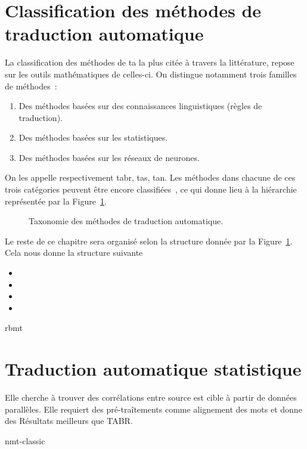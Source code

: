 \section{Classification des méthodes de traduction automatique}

La classification des méthodes de \acrshort{ta} la plus citée à travers la littérature, 
repose sur les outils mathématiques de celles-ci.
On distingue notamment trois familles de méthodes~\cite{deep-nmt-survey}:
\begin{enumerate}
    \item Des méthodes basées sur des connaissances linguistiques (règles de traduction).
    \item Des méthodes basées sur les statistiques.
    \item Des méthodes basées sur les réseaux de neurones.
\end{enumerate}

On les appelle respectivement \Acrfull{tabr}, \Acrfull{tas}, \Acrfull{tan}.
Les méthodes dans chacune de ces trois catégories peuvent être encore classifiées~\cite{deep-nmt-survey,hybrid-mt},
ce qui donne lieu à la hiérarchie représentée par la Figure~\ref{fig:mt-taxonomy-tree}.

\begin{figure}
    \begin{center}
       \resizebox{\textwidth}{!}{
         
       }
    \end{center}
    
    \caption{Taxonomie des méthodes de traduction automatique.}
    \label{fig:mt-taxonomy-tree}
\end{figure}

Le reste de ce chapitre sera organisé selon la structure donnée par la Figure~\ref{fig:mt-taxonomy-tree}. 
Cela nous donne la structure suivante

\begin{itemize}
    \item {}
    \item {}
    \item {}
    \item {}
\end{itemize}

{rbmt}
\section{Traduction automatique statistique}

Elle cherche à trouver des corrélations entre source est cible à partir de données parallèles.
Elle requiert des pré-traîtements comme alignement des mots et donne des Résultats meilleurs que TABR.


\label{sec:smt}
{nmt-classic}
